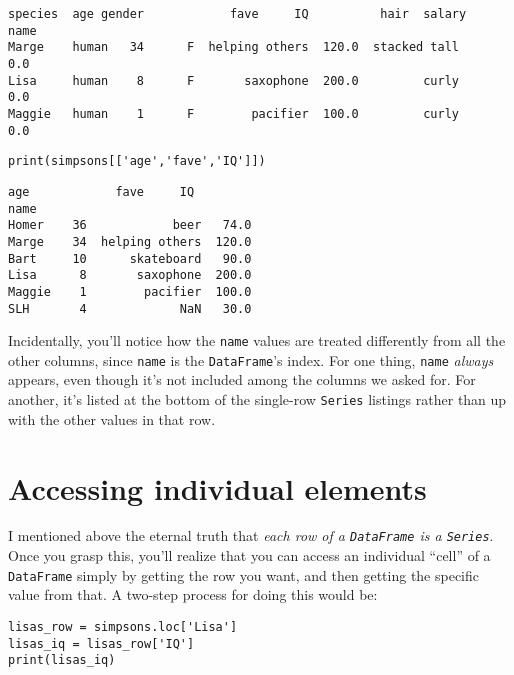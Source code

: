 \begin{Verbatim}[fontsize=\scriptsize,samepage=true,frame=leftline,framesep=5mm,framerule=1mm]
       species  age gender            fave     IQ          hair  salary
name                                                                   
Marge    human   34      F  helping others  120.0  stacked tall     0.0
Lisa     human    8      F       saxophone  200.0         curly     0.0
Maggie   human    1      F        pacifier  100.0         curly     0.0
\end{Verbatim}

\medskip
\begin{Verbatim}[fontsize=\scriptsize,samepage=true,frame=single,framesep=3mm]
print(simpsons[['age','fave','IQ']])
\end{Verbatim}
\vspace{-.2in}

\begin{Verbatim}[fontsize=\scriptsize,samepage=true,frame=leftline,framesep=5mm,framerule=1mm]
        age            fave     IQ
name                              
Homer    36            beer   74.0
Marge    34  helping others  120.0
Bart     10      skateboard   90.0
Lisa      8       saxophone  200.0
Maggie    1        pacifier  100.0
SLH       4             NaN   30.0
\end{Verbatim}

Incidentally, you'll notice how the \texttt{name} values are treated
differently from all the other columns, since \texttt{name} is the
\texttt{DataFrame}'s index. For one thing, \texttt{name} \textit{always}
appears, even though it's not included among the columns we asked for. For
another, it's listed at the bottom of the single-row \texttt{Series} listings
rather than up with the other values in that row.

\section{Accessing individual elements}

\label{accessIndividualElementsOfDataFrame}

I mentioned above the eternal truth that \textit{each row of a
\texttt{DataFrame} is a \texttt{Series}}. Once you grasp this, you'll realize
that you can access an individual ``cell'' of a \texttt{DataFrame} simply by
getting the row you want, and then getting the specific value from that. A
two-step process for doing this would be:

\begin{Verbatim}[fontsize=\small,samepage=true,frame=single,framesep=3mm]
lisas_row = simpsons.loc['Lisa']
lisas_iq = lisas_row['IQ']
print(lisas_iq)
\end{Verbatim}
\vspace{-.2in}

